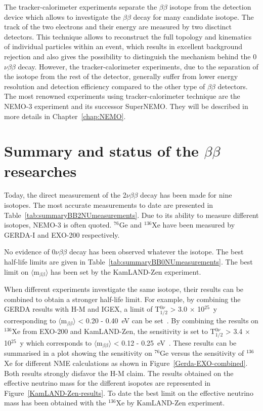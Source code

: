 \documentclass[main.tex]{subfiles}
\begin{document}
\NI The tracker-calorimeter experiments separate the $\beta\beta$ isotope from the detection device which allows to investigate the $\beta\beta$ decay for many candidate isotope. The track of the two electrons and their energy are measured by two disctinct detectors. This technique allows to reconstruct the full topology and kinematics of individual particles within an event, which results in excellent background rejection and also gives the possibility to distinguish the mechanism behind the 0$\nu\beta\beta$ decay. However, the tracker-calorimeter experiments, due to the separation of the isotope from the rest of the detector, generally suffer from lower energy resolution and detection efficiency compared to the other type of $\beta\beta$ detectors. The most renowned experiments using tracker-calorimeter technique are the NEMO-3 experiment and its successor SuperNEMO. They will be described in more details in Chapter~\ref{chap:NEMO}.


\section{Summary and status of the $\beta\beta$ researches}\label{sec:StatusDBD}


\NI Today, the direct measurement of the 2$\nu\beta\beta$ decay has been made for nine isotopes. The most accurate measurements to date are presented in Table~\ref{tab:summaryBB2NUmeasurements}. Due to its ability to measure different isotopes, NEMO-3 is often quoted. $^{\text{76}}$Ge and $^{\text{136}}$Xe have been measured by GERDA-I and EXO-200 respectively.


\bigskip


\NI No evidence of 0$\nu\beta\beta$ decay has been observed whatever the isotope. The best half-life limits are given in Table~\ref{tab:summaryBB0NUmeasurements}. The best limit on $\langle \text{m}_{\beta\beta} \rangle$ has been set by the KamLAND-Zen experiment.


\bigskip


\NI When different experiments investigate the same isotope, their results can be combined to obtain a stronger half-life limit. For example, by combining the GERDA results with H-M and IGEX, a limit of T$_{\text{1/2}}^{\text{0}\nu}$ > 3.0 $\times$ 10$^{\text{25}}$~y corresponding to $\langle \text{m}_{\beta\beta} \rangle$ < 0.20 - 0.40~eV can be set~\cite{GERDA}.  By combining the results on $^{\text{136}}$Xe from EXO-200 and KamLAND-Zen, the sensitivity is set to T$_{\text{1/2}}^{\text{0}\nu}$ > 3.4 $\times$ 10$^{\text{25}}$~y which corresponds to $\langle \text{m}_{\beta\beta} \rangle$ < 0.12 - 0.25~eV~\cite{KamLAND-Zen}. These results can be summarised in a plot showing the sensitivity on $^{\text{76}}$Ge versus the sensitivity of $^{\text{136}}$Xe for different NME calculations as shown in Figure~\ref{Gerda-EXO-combined}. Both results strongly disfavor the H-M claim. The results obtained on the effective neutrino mass for the different isopotes are represented in Figure~\ref{KamLAND-Zen-results}. To date the best limit on the effective neutrino mass has been obtained with the $^{\text{136}}$Xe by KamLAND-Zen experiment.
\end{document}

